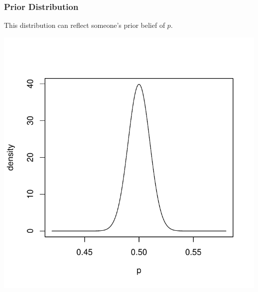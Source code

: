 \documentclass[handout]{beamer}
\newcommand{\blue}[1]{\textcolor{blue2}{#1}}
\begin{document}
\begin{frame}
\frametitle{Prior Distribution}
This distribution can reflect someone's \blue{prior belief} of $p$.  

\begin{center}
\includegraphics[height=0.7\textheight]{figure/prior.pdf} 
\end{center}

\end{frame}
\end{document}
